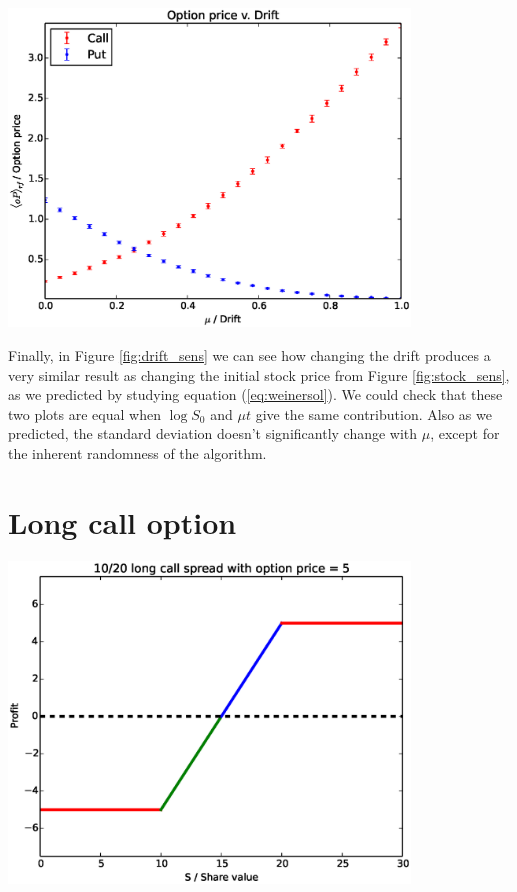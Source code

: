\documentclass[8 pt]{article}
\newenvironment{Figure}
  {\par\medskip\noindent\minipage{\linewidth}}
  {\endminipage\par\medskip}
\begin{document}
\begin{multicols*}{2}
\begin{Figure}
  \begin{center}
    \includegraphics[width=0.8\textwidth]{graphs/oP_drift.eps}
    \label{fig:drift_sens}
  \end{center}
\end{Figure}

Finally, in Figure \ref{fig:drift_sens} we can see how changing the drift produces a very similar result as changing the initial stock price from Figure \ref{fig:stock_sens}, as we predicted by studying equation (\ref{eq:weinersol}). We could check that these two plots are equal when $\log S_0$ and $\mu t$ give the same contribution. Also as we predicted, the standard deviation doesn't significantly change with $\mu$, except for the inherent randomness of the algorithm.

\section{Long call option}

\begin{Figure}
  \begin{center}
    \includegraphics[width=0.8\textwidth]{graphs/long_call_option.eps}
    \label{fig:long_call_option}
  \end{center}
\end{Figure}


\end{multicols*}
\end{document}
